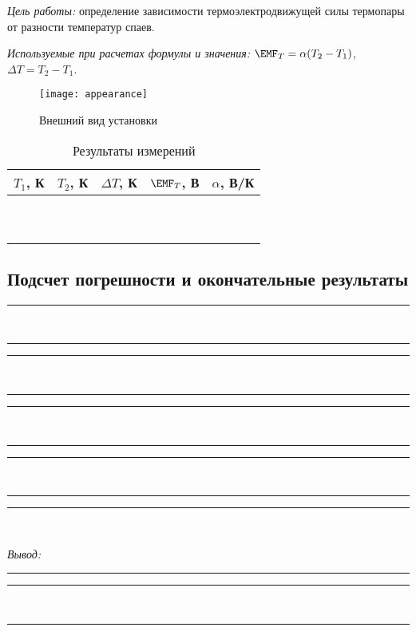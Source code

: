 \documentclass[10pt,pscyr,nonums]{hedlab}
\begin{document}
  \makeheader

  \emph{Цель работы:} определение зависимости термоэлектродвижущей силы
  термопары от разности температур спаев.

  \emph{Используемые при расчетах формулы и значения:}
  \( \EMF_T = \alpha (T_2 - T_1) \), \( \Delta T = T_2 - T_1 \).

  \begin{figure}[h!]
    \center
    \texttt{[image: appearance]} \\
    \parbox{.5\textwidth}{\caption{Внешний вид установки}}
  \end{figure}
  \vspace*{-2em}

  \begin{table}[h!]
    \center \caption{Результаты измерений}
    \begin{tabular}{|*{5}{C{.12}|}} \hline
      \( T_1 \), К & \( T_2 \), К & \( \Delta T \), К &
        \( \EMF_T \), В & \( \alpha \), В/К \\ \hline
       &&&&  \\ 
      &&&& \\ 
      &&&& \\ 
      &&&& \\ 
      &&&& \\ 
      &&&& \\ 
      &&&& \\ 
      &&&& \\ 
      &&&& \\ 
      &&&& \\ \hline
    \end{tabular}
  \end{table}

  \subsection{Подсчет погрешности и окончательные результаты}
  \center
  \rule{.95\textwidth}{.5pt} \\ \rule{.95\textwidth}{.5pt}
  \rule{.95\textwidth}{.5pt} \\ \rule{.95\textwidth}{.5pt}
  \rule{.95\textwidth}{.5pt} \\ \rule{.95\textwidth}{.5pt}
  \rule{.95\textwidth}{.5pt} \\ \rule{.95\textwidth}{.5pt}
  \rule{.95\textwidth}{.5pt} \\ \vspace*{2em}

  \emph{Вывод:} \rule{.885\textwidth}{.5pt}
  \rule{.95\textwidth}{.5pt} \\ \rule{.95\textwidth}{.5pt}
\end{document}
